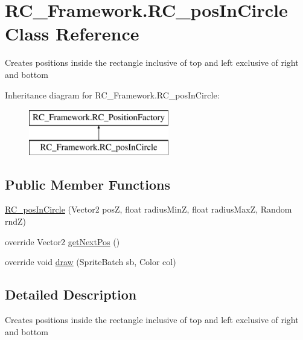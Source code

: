 \hypertarget{class_r_c___framework_1_1_r_c__pos_in_circle}{}\section{R\+C\+\_\+\+Framework.\+R\+C\+\_\+pos\+In\+Circle Class Reference}
\label{class_r_c___framework_1_1_r_c__pos_in_circle}


Creates positions inside the rectangle inclusive of top and left exclusive of right and bottom  


Inheritance diagram for R\+C\+\_\+\+Framework.\+R\+C\+\_\+pos\+In\+Circle\+:\begin{figure}[H]
\begin{center}
\leavevmode
\includegraphics[height=2.000000cm]{class_r_c___framework_1_1_r_c__pos_in_circle}
\end{center}
\end{figure}
\subsection*{Public Member Functions}
\begin{DoxyCompactItemize}
\item 
\mbox{\hyperlink{class_r_c___framework_1_1_r_c__pos_in_circle_a6f5bee60c5ab75935b6ce528473f8b9f}{R\+C\+\_\+pos\+In\+Circle}} (Vector2 posZ, float radius\+MinZ, float radius\+MaxZ, Random rndZ)
\item 
override Vector2 \mbox{\hyperlink{class_r_c___framework_1_1_r_c__pos_in_circle_a4cec38bb6d1617a7ad918d59c5125df9}{get\+Next\+Pos}} ()
\item 
override void \mbox{\hyperlink{class_r_c___framework_1_1_r_c__pos_in_circle_ad59a9527d30ddfa0b15c4210907d3051}{draw}} (Sprite\+Batch sb, Color col)
\end{DoxyCompactItemize}


\subsection{Detailed Description}
Creates positions inside the rectangle inclusive of top and left exclusive of right and bottom 



